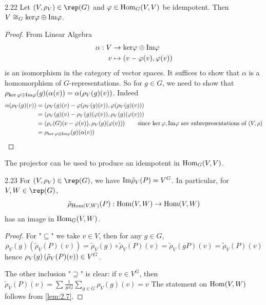 \documentclass[twoside = false,	%
		headsepline,		%
		parskip = true,
		]{scrbook}						%
\begin{document}
    \begin{lemma}{}{2.22}
        Let $(V,\rho_V) \in \rep(G)$ and $\varphi\in\mathrm{Hom}_G(V,V)$ be idempotent. Then $V\cong_G\mathrm{ker}\varphi\oplus\mathrm{Im}\varphi$.
    \end{lemma}
    \begin{proof}
        From Linear Algebra \cite{LA}
        \begin{equation*}
        \begin{split}
            \alpha: V &\to \mathrm{ker}\varphi\oplus\mathrm{Im}\varphi \\
            v &\mapsto \left( v-\varphi(v), \varphi(v)\right)
        \end{split}
        \end{equation*}
        is an isomorphism in the category of vector spaces. It suffices to show that $\alpha$ is a homomorphism of $G$-representations. So for $g\in G$, we need to show that
        $\rho_{\ker\varphi\oplus\mathrm{Im}\varphi}(g)(\alpha(v))= \alpha(\rho_V(g)(v))$. 
        Indeed
        \begin{align*}
            \alpha(\rho_V(g)(v))&=\left( \rho_V(g)(v)-\varphi(\rho_V(g)(v)), \varphi(\rho_V(g)(v))\right)\\
            &=\left( \rho_V(g)(v)-\rho_V(g)(\varphi(v)), \rho_V(g)(\varphi(v))\right)\\
            &=\left( \rho_v(G)(v-\varphi(v)),\rho_V(g)(\varphi(v))\right)\qquad \text{since $\ker\varphi, \mathrm{Im}\varphi$ are subrepresentations of $(V,\rho)$}\\
            &= \rho_{\ker\varphi\oplus\mathrm{Im}\varphi}(g)(\alpha(v))
        \end{align*}
    \end{proof}

    The projector can be used to produce an idempotent in $\mathrm{Hom}_G(V,V)$.

    \begin{corollary}{}{2.23}
        For $(V,\rho_V) \in\rep(G)$, we have $\mathrm{Im}\tilde\rho_V(P)=V^G$.
        In particular, for $V,W\in\rep(G)$, 
        $$\tilde\rho_{\mathrm{Hom}(V,W)}(P): \mathrm{Hom}(V,W)\to \mathrm{Hom}(V,W)$$ has an image in $\mathrm{Hom}_G(V,W)$.
    \end{corollary}
    \begin{proof}
        For "$\subseteq$" we take $v\in V$, then for any $g\in G$,
        $$\rho_V(g)(\tilde\rho_V(P)(v)) = \tilde{\rho}_V(g) \circ \tilde{\rho}_V(P)(v) = \tilde\rho_V(gP)(v) = \tilde\rho_V(P)(v)$$
        hence $\rho_V(g)\left( \tilde\rho_V(P)(v)\right)\in V^G$.
        
        The other inclusion "$\supseteq$" is clear: if $v\in V^G$, then $\tilde\rho_V(P)(v)=\sum\frac1{\#G}\sum_{g\in G}\rho_V(g)(v)=v$
        The statement on $\mathrm{Hom}(V,W)$ follows from \ref{lem:2.7}.
    \end{proof}
\end{document}
